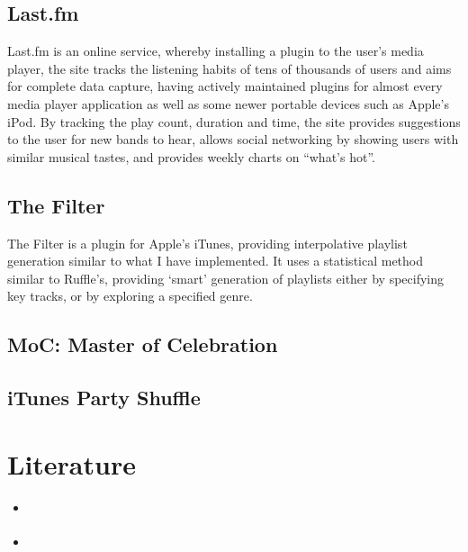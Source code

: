 \subsection{Last.fm}
Last.fm is an online service, whereby installing a plugin to the user's media player, the site tracks the listening habits of tens of thousands of users and aims for complete data capture, having actively maintained plugins for almost every media player application as well as some newer portable devices such as Apple's iPod. By tracking the play count, duration and time, the site provides suggestions to the user for new bands to hear, allows social networking by showing users with similar musical tastes, and provides weekly charts on ``what's hot''.
\subsection{The Filter}
The Filter is a plugin for Apple's iTunes, providing interpolative playlist generation similar to what I have implemented. It uses a statistical method similar to Ruffle's, providing `smart' generation of playlists either by specifying key tracks, or by exploring a specified genre.
\subsection{MoC: Master of Celebration}
\subsection{iTunes Party Shuffle}
\section{Literature}
\begin{itemize}
	\item \citet*{Aucouturier2002,Aucouturier2002a,Aucouturier2003}
	\item \citet*{Logan2002}
\end{itemize}

